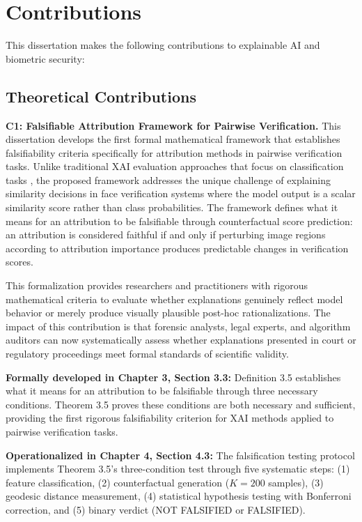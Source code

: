 \section{Contributions}
\label{sec:contributions}

This dissertation makes the following contributions to explainable AI and biometric security:

\subsection{Theoretical Contributions}

\textbf{C1: Falsifiable Attribution Framework for Pairwise Verification.} This dissertation develops the first formal mathematical framework that establishes falsifiability criteria specifically for attribution methods in pairwise verification tasks. Unlike traditional XAI evaluation approaches that focus on classification tasks \cite{Adebayo2018_SanityChecks,hooker2019benchmark}, the proposed framework addresses the unique challenge of explaining similarity decisions in face verification systems where the model output is a scalar similarity score rather than class probabilities. The framework defines what it means for an attribution to be falsifiable through counterfactual score prediction: an attribution is considered faithful if and only if perturbing image regions according to attribution importance produces predictable changes in verification scores.

This formalization provides researchers and practitioners with rigorous mathematical criteria to evaluate whether explanations genuinely reflect model behavior or merely produce visually plausible post-hoc rationalizations. The impact of this contribution is that forensic analysts, legal experts, and algorithm auditors can now systematically assess whether explanations presented in court or regulatory proceedings meet formal standards of scientific validity.

\vspace{0.3cm}
\noindent\textbf{Formally developed in Chapter 3, Section 3.3:} Definition 3.5 establishes what it means for an attribution to be falsifiable through three necessary conditions. Theorem 3.5 proves these conditions are both necessary and sufficient, providing the first rigorous falsifiability criterion for XAI methods applied to pairwise verification tasks.

\vspace{0.3cm}
\noindent\textbf{Operationalized in Chapter 4, Section 4.3:} The falsification testing protocol implements Theorem 3.5's three-condition test through five systematic steps: (1) feature classification, (2) counterfactual generation ($K=200$ samples), (3) geodesic distance measurement, (4) statistical hypothesis testing with Bonferroni correction, and (5) binary verdict (NOT FALSIFIED or FALSIFIED).

